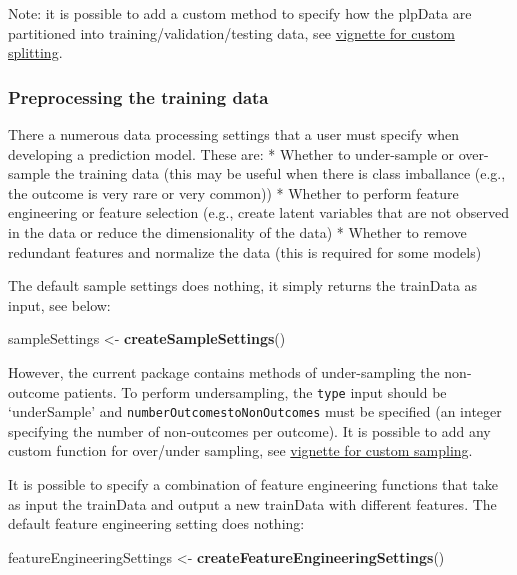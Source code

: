 \documentclass[
]{article}
\newenvironment{Shaded}{\begin{snugshade}}{\end{snugshade}}
\newcommand{\FunctionTok}[1]{\textcolor[rgb]{0.13,0.29,0.53}{\textbf{#1}}}
\newcommand{\NormalTok}[1]{#1}
\newcommand{\OtherTok}[1]{\textcolor[rgb]{0.56,0.35,0.01}{#1}}
\begin{document}
Note: it is possible to add a custom method to specify how the plpData
are partitioned into training/validation/testing data, see
\href{https://github.com/OHDSI/PatientLevelPrediction/blob/master/inst/doc/AddingCustomSplitting.pdf}{vignette
for custom splitting}.

\hypertarget{preprocessing-the-training-data-1}{%
\subsubsection{Preprocessing the training
data}\label{preprocessing-the-training-data-1}}

There a numerous data processing settings that a user must specify when
developing a prediction model. These are: * Whether to under-sample or
over-sample the training data (this may be useful when there is class
imballance (e.g., the outcome is very rare or very common)) * Whether to
perform feature engineering or feature selection (e.g., create latent
variables that are not observed in the data or reduce the dimensionality
of the data) * Whether to remove redundant features and normalize the
data (this is required for some models)

The default sample settings does nothing, it simply returns the
trainData as input, see below:

\begin{Shaded}
\begin{Highlighting}[]
\NormalTok{  sampleSettings }\OtherTok{\textless{}{-}} \FunctionTok{createSampleSettings}\NormalTok{()}
\end{Highlighting}
\end{Shaded}

However, the current package contains methods of under-sampling the
non-outcome patients. To perform undersampling, the \texttt{type} input
should be `underSample' and \texttt{numberOutcomestoNonOutcomes} must be
specified (an integer specifying the number of non-outcomes per
outcome). It is possible to add any custom function for over/under
sampling, see
\href{https://github.com/OHDSI/PatientLevelPrediction/blob/master/inst/doc/AddingCustomSamples.pdf}{vignette
for custom sampling}.

It is possible to specify a combination of feature engineering functions
that take as input the trainData and output a new trainData with
different features. The default feature engineering setting does
nothing:

\begin{Shaded}
\begin{Highlighting}[]
\NormalTok{  featureEngineeringSettings }\OtherTok{\textless{}{-}} \FunctionTok{createFeatureEngineeringSettings}\NormalTok{()}
\end{Highlighting}
\end{Shaded}
\end{document}
